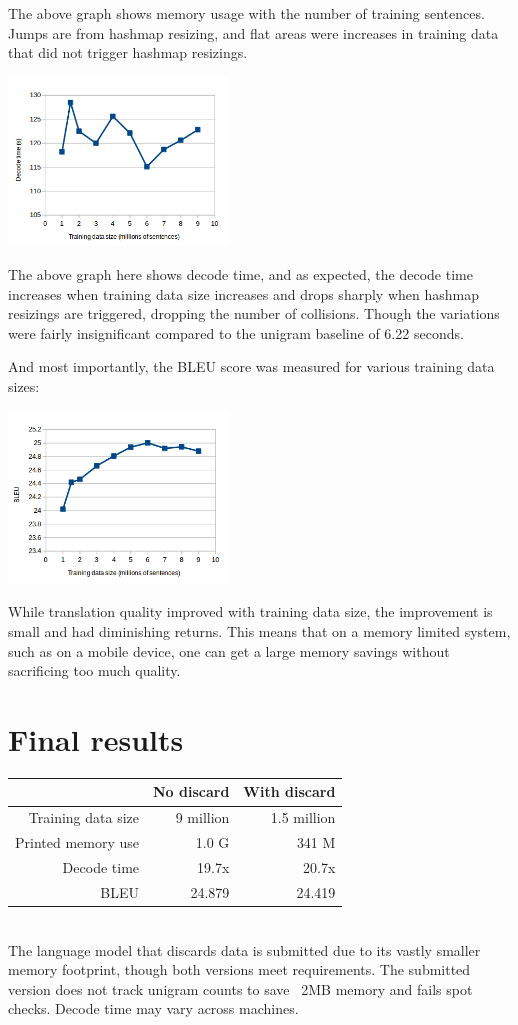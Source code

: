 \documentclass[11pt]{article}
\begin{document}
The above graph shows memory usage with the number of training sentences. Jumps are from hashmap resizing, and flat areas were increases in training data that did not trigger hashmap resizings.

\includegraphics[keepaspectratio=true, width=220px]{decode.png}

The above graph here shows decode time, and as expected, the decode time increases when training data size increases and drops sharply when hashmap resizings are triggered, dropping the number of collisions. Though the variations were fairly insignificant compared to the unigram baseline of 6.22 seconds.

And most importantly, the BLEU score was measured for various training data sizes:

\includegraphics[keepaspectratio=true, width=220px]{bleu.png}

While translation quality improved with training data size, the improvement is small and had diminishing returns. This means that on a memory limited system, such as on a mobile device, one can get a large memory savings without sacrificing too much quality.

\section{Final results}

\begin{tabular}{| r | r | r |}
\hline
 & No discard & With discard \\ \hline
Training data size & 9 million & 1.5 million \\ \hline
Printed memory use & 1.0 G & 341 M \\ \hline
Decode time & 19.7x & 20.7x \\ \hline
BLEU & 24.879 & 24.419 \\ \hline
\end{tabular}
\\

The language model that discards data is submitted due to its vastly smaller memory footprint, though both versions meet requirements. The submitted version does not track unigram counts to save ~2MB memory and fails spot checks. Decode time may vary across machines.
\end{document}
